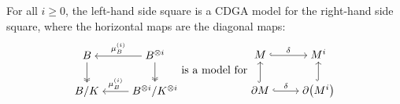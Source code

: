 \begin{lemma}
  \label{cnfbnd.lem.square}
  For all $i \geq 0$, the left-hand side square is a CDGA model for the right-hand side square, where the horizontal maps are the diagonal maps:
  \[ \begin{tikzcd}[cramped]
      B \ar[two heads, d] & B^{\otimes i} \ar[two heads, d] \ar[l, "\mu_{B}^{(i)}" swap] \\
      B / K & B^{\otimes i} / K^{\otimes i} \ar[l, "\mu_{B}^{(i)}" swap]
    \end{tikzcd}
    \text{ is a model for }
    \begin{tikzcd}[cramped]
      M \ar[r, hook, "\delta"] & M^{i} \\
      \partial M \ar[hook, u] \ar[r, hook, "\delta"] & \partial \bigl( M^{i} \bigr) \ar[hook, u]
    \end{tikzcd} \]
\end{lemma}
